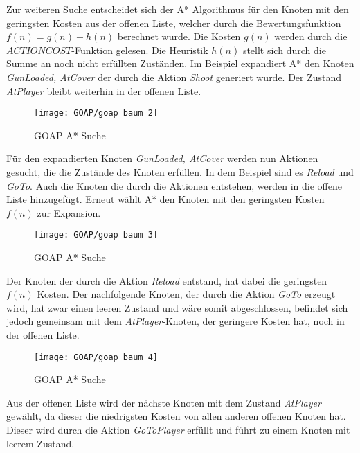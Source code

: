 Zur weiteren Suche entscheidet sich der A* Algorithmus für den Knoten mit den geringsten Kosten aus der offenen Liste, welcher durch die Bewertungsfunktion $f(n) = g(n) + h(n)$ berechnet wurde. Die Kosten $g(n)$ werden durch die $\textit{ACTIONCOST}$-Funktion gelesen. Die Heuristik $h(n)$ stellt sich durch die Summe an noch nicht erfüllten Zuständen. Im Beispiel expandiert A* den Knoten \textit{GunLoaded, AtCover} der durch die Aktion \textit{Shoot} generiert wurde. Der Zustand \textit{AtPlayer} bleibt weiterhin in der offenen Liste.

\begin{figure}[h]
  \centering
  \texttt{[image: GOAP/goap baum 2]}
	\captionsetup{justification=justified, format=plain}
  \caption{GOAP A* Suche}
  \label{fig:goap2}
\end{figure}

Für den expandierten Knoten \textit{GunLoaded, AtCover} werden nun Aktionen gesucht, die die Zustände des Knoten erfüllen. In dem Beispiel sind es \textit{Reload} und \textit{GoTo}. Auch die Knoten die durch die Aktionen entstehen, werden in die offene Liste hinzugefügt. Erneut wählt A* den Knoten mit den geringsten Kosten $f(n)$ zur Expansion.
\clearpage

\begin{figure}[h]
  \centering
  \texttt{[image: GOAP/goap baum 3]}
	\captionsetup{justification=justified, format=plain}
  \caption{GOAP A* Suche}
  \label{fig:goap3}
\end{figure}

Der Knoten der durch die Aktion \textit{Reload} entstand, hat dabei die geringsten $f(n)$ Kosten. Der nachfolgende Knoten, der durch die Aktion \textit{GoTo} erzeugt wird, hat zwar einen leeren Zustand und wäre somit abgeschlossen, befindet sich jedoch gemeinsam mit dem \textit{AtPlayer}-Knoten, der geringere Kosten hat, noch in der offenen Liste.

\begin{figure}[h]
  \centering
  \texttt{[image: GOAP/goap baum 4]}
	\captionsetup{justification=justified, format=plain}
  \caption{GOAP A* Suche}
  \label{fig:goap4}
\end{figure}

Aus der offenen Liste wird der nächste Knoten mit dem Zustand \textit{AtPlayer} gewählt, da dieser die niedrigsten Kosten von allen anderen offenen Knoten hat. Dieser wird durch die Aktion \textit{GoToPlayer} erfüllt und führt zu einem Knoten mit leerem Zustand.

